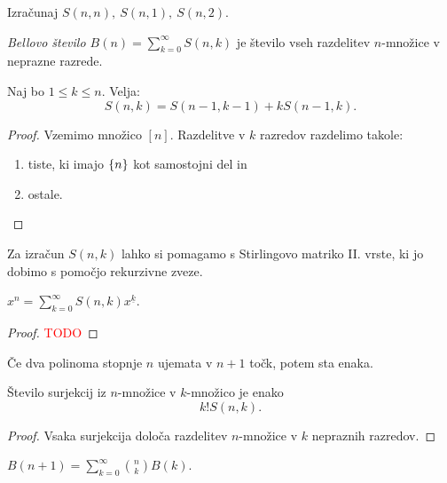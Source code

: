 \begin{primer}
    Izračunaj $S(n, n), \ S(n, 1), \ S(n,2)$.
\end{primer}

\begin{definicija}
    \emph{Bellovo število $B(n) = \sum_{k=0}^{\infty} S(n,k)$} je število vseh razdelitev $n$-množice v neprazne razrede.
\end{definicija}

\begin{trditev}
    Naj bo $1 \leq k \leq n$. Velja:
    $$S(n,k) = S(n-1, k-1) + k S(n-1, k).$$
\end{trditev}

\begin{proof}
    Vzemimo množico $[n]$. Razdelitve v $k$ razredov razdelimo takole:
    \begin{enumerate}
        \item tiste, ki imajo $\left\{n\right\}$ kot samostojni del in
        \item ostale.
    \end{enumerate}
\end{proof}

Za izračun $S(n,k)$ lahko si pomagamo s Stirlingovo matriko II. vrste, ki jo dobimo s pomočjo rekurzivne zveze.

\begin{trditev}
    $x^n=\sum_{k=0}^{\infty} S(n,k) x^{\underline{k}}$.
\end{trditev}

\begin{proof}
    \textcolor{red}{TODO}
\end{proof}

\begin{opomba}
    Če dva polinoma stopnje $n$ ujemata v $n+1$ točk, potem sta enaka.
\end{opomba}

\begin{izrek}
    Število surjekcij iz $n$-množice v $k$-množico je enako 
    $$k! S(n,k).$$
\end{izrek}

\begin{proof}
    Vsaka surjekcija določa razdelitev $n$-množice v $k$ nepraznih razredov.
\end{proof}

\begin{trditev}
    $B(n+1) = \sum_{k=0}^{\infty} \binom{n}{k} B(k)$.
\end{trditev}

